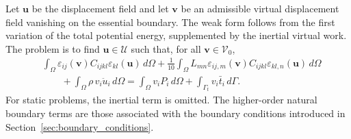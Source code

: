 \documentclass[final,3p,times,fleqn]{elsarticle}
\begin{document}
Let $\mathbf{u}$ be the displacement field and let $\mathbf{v}$ be an
admissible virtual displacement field vanishing on the essential
boundary. The weak form follows from the first variation of the total
potential energy, supplemented by the inertial virtual work. The problem
is to find $\mathbf{u}\in\mathcal{U}$ such that, for all
$\mathbf{v}\in\mathcal{V}_0$,
\begin{align}
\label{eq:fem_weak_form_general}
&
\int_{\Omega}
\varepsilon_{ij}(\mathbf{v})C_{ijkl}\varepsilon_{kl}(\mathbf{u})
\,d\Omega
+
\frac{1}{10}
\int_{\Omega}
L_{mn}
\varepsilon_{ij,m}(\mathbf{v})
C_{ijkl}
\varepsilon_{kl,n}(\mathbf{u})
\,d\Omega
\nonumber\\
&\qquad
+
\int_{\Omega}
\rho\,v_i\ddot{u}_i\,d\Omega
=
\int_{\Omega}v_iP_i\,d\Omega
+
\int_{\Gamma_t}v_i\bar{t}_i\,d\Gamma .
\end{align}
For static problems, the inertial term is omitted. The higher-order
natural boundary terms are those associated with the boundary conditions
introduced in Section~\ref{sec:boundary_conditions}.
\end{document}

